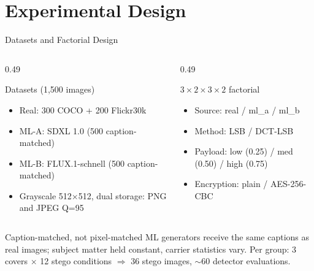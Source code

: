 \documentclass[aspectratio=169,11pt]{beamer}
\begin{document}
\section{Experimental Design}
\begin{frame}{Datasets and Factorial Design}
\small
\begin{columns}[T]
\begin{column}{0.49\textwidth}
\begin{block}{Datasets (1{,}500 images)}
\begin{itemize}
\item Real: 300 COCO + 200 Flickr30k
\item ML-A: SDXL 1.0 (500 caption-matched)
\item ML-B: FLUX.1-schnell (500 caption-matched)
\item Grayscale 512$\times$512, dual storage: PNG and JPEG Q=95
\end{itemize}
\end{block}
\end{column}
\begin{column}{0.49\textwidth}
\begin{block}{$3 \times 2 \times 3 \times 2$ factorial}
\begin{itemize}
\item Source: real / ml\_a / ml\_b
\item Method: LSB / DCT-LSB
\item Payload: low (0.25) / med (0.50) / high (0.75)
\item Encryption: plain / AES-256-CBC
\end{itemize}
\end{block}
\end{column}
\end{columns}
\vspace{0.1cm}
\begin{exampleblock}{Caption-matched, not pixel-matched}
ML generators receive the same captions as real images; subject matter held constant, carrier statistics vary. Per group: 3 covers $\times$ 12 stego conditions $\Rightarrow$ 36 stego images, $\sim$60 detector evaluations.
\end{exampleblock}
\end{frame}
\end{document}
